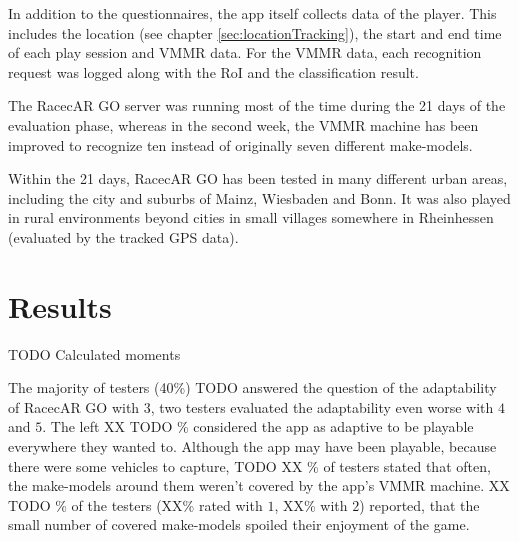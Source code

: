 In addition to the questionnaires, the app itself collects data of the player. This includes the location (see chapter \ref{sec:locationTracking}), the start and end time of each play session and VMMR data. For the VMMR data, each recognition request was logged along with the RoI and the classification result.

The RacecAR GO server was running most of the time during the 21 days of the evaluation phase, whereas in the second week, the VMMR machine has been improved to recognize ten instead of originally seven different make-models.

Within the 21 days, RacecAR GO has been tested in many different urban areas, including the city and suburbs of Mainz, Wiesbaden and Bonn. It was also played in rural environments beyond cities in small villages somewhere in Rheinhessen (evaluated by the tracked GPS data).

\section{Results}
TODO Calculated moments

The majority of testers (40\%) TODO answered the question of the adaptability of RacecAR GO with $3$, two testers evaluated the adaptability even worse with $4$ and $5$. The left XX TODO \% considered the app as adaptive to be playable everywhere they wanted to. Although the app may have been playable, because there were some vehicles to capture, TODO XX \% of testers stated that often, the make-models around them weren't covered by the app's VMMR machine. XX TODO \% of the testers (XX\% rated with $1$, XX\% with $2$) reported, that the small number of covered make-models spoiled their enjoyment of the game.

